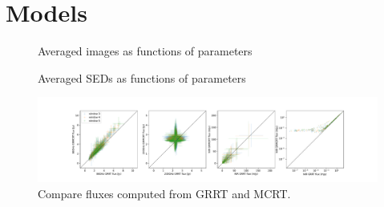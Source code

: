 \section{Models}\label{app:models}

\begin{figure}
  \caption{Averaged images as functions of parameters}
  \label{fig:imgs}
\end{figure}

\begin{figure}
  \caption{Averaged SEDs as functions of parameters}
  \label{fig:seds}
\end{figure}

\begin{figure}
  \centering
  \includegraphics[width=\textwidth]{figures/GRRT_vs_MCRT.pdf}
  \caption{Compare fluxes computed from GRRT and MCRT.}
  \label{fig:GRRT_vs_MCRT}
\end{figure}
